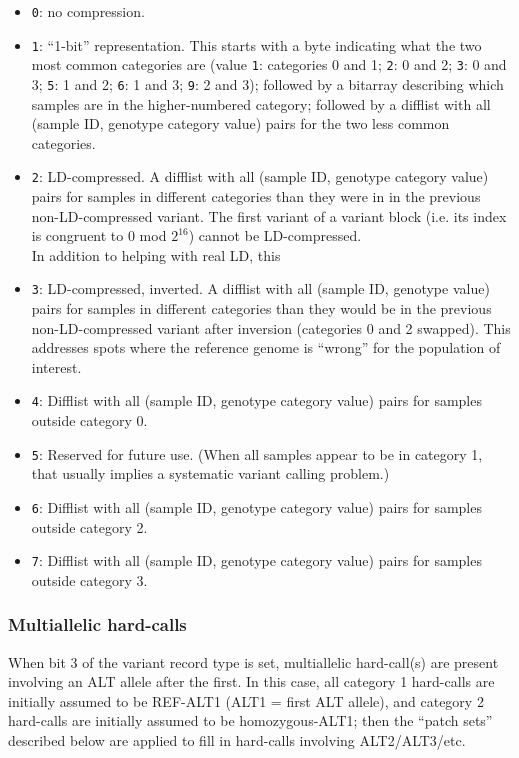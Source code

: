 \documentclass[8pt]{article}
\begin{document}
\begin{itemize}
\item \texttt{0}: no compression.
\item \texttt{1}: ``1-bit'' representation.  This starts with a byte indicating
  what the two most common categories are (value \texttt{1}: categories 0 and
  1; \texttt{2}: 0 and 2; \texttt{3}: 0 and 3; \texttt{5}: 1 and 2; \texttt{6}:
  1 and 3; \texttt{9}: 2 and 3); followed by a bitarray describing which
  samples are in the higher-numbered category; followed by a difflist with all
  (sample ID, genotype category value) pairs for the two less common
  categories.
\item \texttt{2}: LD-compressed.  A difflist with all (sample ID, genotype
  category value) pairs for samples in different categories than they were in
  in the previous non-LD-compressed variant.  The first variant of a variant
  block (i.e. its index is congruent to 0 mod $2^{16}$) cannot be
  LD-compressed. \\
  In addition to helping with real LD, this
\item \texttt{3}: LD-compressed, inverted.  A difflist with all (sample ID,
  genotype value) pairs for samples in different categories than they would be
  in the previous non-LD-compressed variant after inversion (categories 0 and 2
  swapped).  This addresses spots where the reference genome is ``wrong'' for
  the population of interest.
\item \texttt{4}: Difflist with all (sample ID, genotype category value) pairs
  for samples outside category 0.
\item \texttt{5}: Reserved for future use.  (When all samples appear to be in
  category 1, that usually implies a systematic variant calling problem.)
\item \texttt{6}: Difflist with all (sample ID, genotype category value) pairs
  for samples outside category 2.
\item \texttt{7}: Difflist with all (sample ID, genotype category value) pairs
  for samples outside category 3.
\end{itemize}

\subsubsection{Multiallelic hard-calls}

When bit 3 of the variant record type is set, multiallelic hard-call(s) are
present involving an ALT allele after the first.  In this case, all category 1
hard-calls are initially assumed to be REF-ALT1 (ALT1 = first ALT allele), and
category 2 hard-calls are initially assumed to be homozygous-ALT1; then the
``patch sets'' described below are applied to fill in hard-calls involving
ALT2/ALT3/etc.
\end{document}
